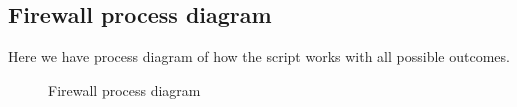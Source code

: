 \subsection{Firewall process diagram}
Here we have process diagram of how the script works with all possible outcomes.

\begin{figure}[H]
	\usetikzlibrary{shapes,arrows,calc}
	\centering
	
	\caption{Firewall process diagram}
\end{figure}
\newpage
